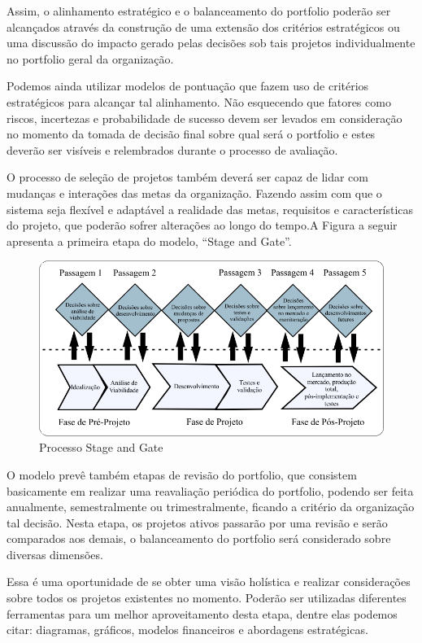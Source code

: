 \documentclass[12pt,a4paper,ruledheader,tocpage=prefix,floatnumber=continuous,pagestart=folhaderosto,font=times]{abnt}
\begin{document}
Assim, o alinhamento estratégico e o balanceamento do portfolio poderão ser alcançados através da construção de uma extensão dos critérios estratégicos ou
uma discussão do impacto gerado pelas decisões sob tais projetos individualmente no portfolio geral da organização. 

Podemos ainda utilizar modelos de pontuação que fazem uso de critérios estratégicos para alcançar tal alinhamento. Não esquecendo que fatores como riscos,
incertezas e probabilidade de sucesso devem ser levados em consideração no momento da tomada de decisão final sobre qual será o portfolio e estes 
deverão ser visíveis e relembrados durante o processo de avaliação.

O processo de seleção de projetos também deverá ser capaz de lidar com mudanças e interações das metas da organização. Fazendo assim com que o sistema seja 
flexível e adaptável a realidade das metas, requisitos e características do projeto, que poderão sofrer alterações ao longo do tempo.A Figura a seguir 
apresenta a primeira etapa do modelo, ``Stage and Gate''.

\begin{figure}[H]
\centering
\includegraphics[width=.9\textwidth]{img/fig8.png}
\caption{Processo Stage and Gate}
\end{figure}

O modelo prevê também etapas de revisão do portfolio, que consistem basicamente em realizar uma reavaliação periódica do portfolio, podendo ser feita
anualmente, semestralmente ou trimestralmente, ficando a critério da organização tal decisão. Nesta etapa, os projetos ativos passarão por uma revisão
e serão comparados aos demais, o balanceamento do portfolio será considerado sobre diversas dimensões. 

Essa é uma oportunidade de se obter uma visão holística e realizar considerações sobre todos os projetos existentes no momento. Poderão ser utilizadas 
diferentes ferramentas para um melhor aproveitamento desta etapa, dentre elas podemos citar: diagramas, gráficos, modelos financeiros e abordagens 
estratégicas.
\end{document}

